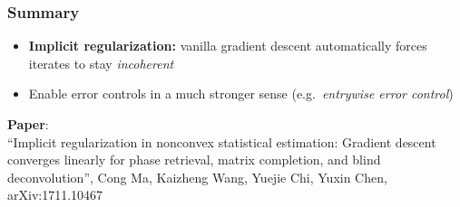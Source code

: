 \documentclass[compress,
mathserif,wide,%
]{beamer}
\begin{document}
\begin{frame}
	\frametitle{Summary}

	\begin{itemize}
		\itemsep0.5em

		\item {\bf Implicit regularization:} vanilla gradient descent automatically forces iterates to stay {\em incoherent}

		\pause
		\item Enable error controls in a much stronger sense (e.g.~{\em entrywise error control})
	\end{itemize}

\vfill

	{\footnotesize \textbf{Paper}: \\ \vspace{1em} ``{Implicit regularization in nonconvex statistical estimation:  Gradient descent converges linearly for phase retrieval, matrix completion, and blind deconvolution}'', Cong Ma, Kaizheng Wang, Yuejie Chi, Yuxin Chen, arXiv:1711.10467}



\end{frame}
\end{document}
